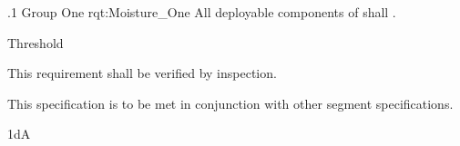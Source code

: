 \ONERQMTVKSA
{\RqtNumberBase.1}
{Group One}
{rqt:Moisture_One}
{All deployable components of \ThisSys shall \TBD.}
{
	\item [Phase 1] Threshold
}
{This requirement shall be verified by inspection.}
{
	\item [\cite{ref__BDP_FOS_CDD}] \TBD
}
{
	\item This specification is to be met in conjunction with other segment specifications.
}
{1dA}

